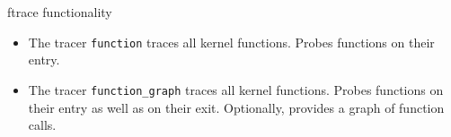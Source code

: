 \documentclass{beamer}
\begin{document}
\begin{frame}{ftrace functionality}
  \begin{itemize}
  \item The tracer \texttt{function} traces all kernel
    functions. Probes functions on their entry.
  \item The tracer \texttt{function\_graph} traces all kernel
    functions. Probes functions on their entry as well as on their
    exit. Optionally, provides a graph of function calls.

  \end{itemize}
\end{frame}
\end{document}
